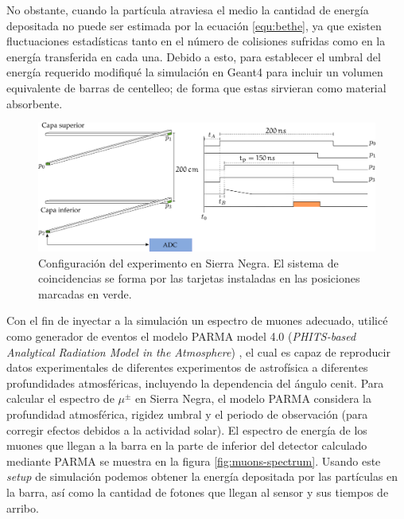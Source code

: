 No obstante, cuando la partícula atraviesa el medio la cantidad de energía depositada no puede ser estimada por la ecuación \ref{equ:bethe}, ya que existen fluctuaciones estadísticas tanto en el número de colisiones sufridas como en la energía transferida en cada una. Debido a esto, para establecer el umbral del energía requerido modifiqué la simulación en Geant4 para incluir un volumen equivalente de barras de centelleo; de forma que estas sirvieran como material absorbente.

\begin{figure}
        \centering
        \includegraphics[width=\textwidth]{muons-experiment.pdf}
        \caption{Configuración del experimento en Sierra Negra. El sistema de coincidencias se forma por las tarjetas instaladas en las posiciones marcadas en verde.}
        \label{fig:muons-experiment}
\end{figure}

Con el fin de inyectar a la simulación un espectro de muones adecuado, utilicé como generador de eventos el modelo PARMA model 4.0 (\emph{PHITS-based Analytical Radiation Model in the Atmosphere}) \cite{sato15,sato16}, el cual es capaz de reproducir datos experimentales de diferentes experimentos de astrofísica a diferentes profundidades atmosféricas, incluyendo la dependencia del ángulo cenit. Para calcular el espectro de $\mu^{\pm}$ en Sierra Negra, el modelo PARMA considera la profundidad atmosférica, rigidez umbral y el periodo de observación (para corregir efectos debidos a la actividad solar). El espectro de energía de los muones que llegan a la barra en la parte de inferior del detector calculado mediante PARMA se muestra en la figura \ref{fig:muons-spectrum}. Usando este \emph{setup} de simulación podemos obtener la energía depositada por las partículas en la barra, así como la cantidad de fotones que llegan al sensor y sus tiempos de arribo.

